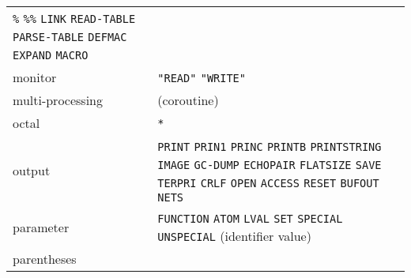 \documentclass[a4paper]{scrbook}
\begin{document}
\begin{longtable}[]{@{}ll@{}}
\begin{minipage}[t]{0.83\columnwidth}
\texttt{\%} \texttt{\%\%} \texttt{LINK} \texttt{READ-TABLE} \texttt{PARSE-TABLE} \texttt{DEFMAC} \texttt{EXPAND}
\texttt{MACRO}\strut
\end{minipage}\tabularnewline
\begin{minipage}[t]{0.11\columnwidth}\raggedright\strut
monitor\strut
\end{minipage} & \begin{minipage}[t]{0.83\columnwidth}\raggedright\strut
\texttt{"READ"} \texttt{"WRITE"}\strut
\end{minipage}\tabularnewline
\begin{minipage}[t]{0.11\columnwidth}\raggedright\strut
multi-processing\strut
\end{minipage} & \begin{minipage}[t]{0.83\columnwidth}\raggedright\strut
(coroutine)\strut
\end{minipage}\tabularnewline
\begin{minipage}[t]{0.11\columnwidth}\raggedright\strut
octal\strut
\end{minipage} & \begin{minipage}[t]{0.83\columnwidth}\raggedright\strut
\texttt{*}\strut
\end{minipage}\tabularnewline
\begin{minipage}[t]{0.11\columnwidth}\raggedright\strut
output\strut
\end{minipage} & \begin{minipage}[t]{0.83\columnwidth}\raggedright\strut
\texttt{PRINT} \texttt{PRIN1} \texttt{PRINC} \texttt{PRINTB} \texttt{PRINTSTRING} \texttt{IMAGE} \texttt{GC-DUMP}
\texttt{ECHOPAIR} \texttt{FLATSIZE} \texttt{SAVE} \texttt{TERPRI} \texttt{CRLF} \texttt{OPEN} \texttt{ACCESS}
\texttt{RESET} \texttt{BUFOUT} \texttt{NETS}\strut
\end{minipage}\tabularnewline
\begin{minipage}[t]{0.11\columnwidth}\raggedright\strut
parameter\strut
\end{minipage} & \begin{minipage}[t]{0.83\columnwidth}\raggedright\strut
\texttt{FUNCTION} \texttt{ATOM} \texttt{LVAL} \texttt{SET} \texttt{SPECIAL} \texttt{UNSPECIAL} (identifier value)\strut
\end{minipage}\tabularnewline
\begin{minipage}[t]{0.11\columnwidth}\raggedright\strut
parentheses\strut
\end{minipage} & \begin{minipage}[t]{0.83\columnwidth}\raggedright\strut

\end{minipage}
\end{longtable}
\end{document}
